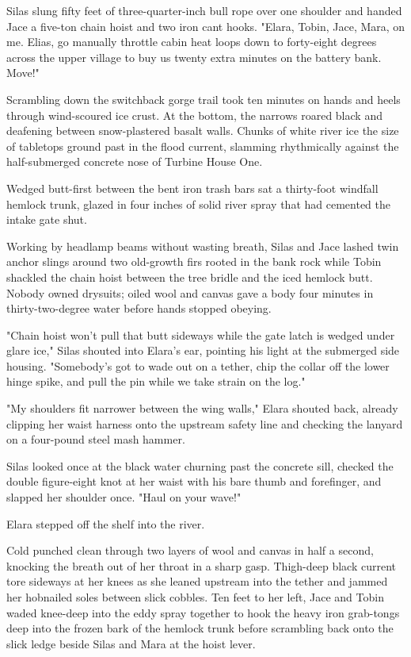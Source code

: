 Silas slung fifty feet of three-quarter-inch bull rope over one shoulder and handed Jace a five-ton chain hoist and two iron cant hooks. "Elara, Tobin, Jace, Mara, on me. Elias, go manually throttle cabin heat loops down to forty-eight degrees across the upper village to buy us twenty extra minutes on the battery bank. Move!"

Scrambling down the switchback gorge trail took ten minutes on hands and heels through wind-scoured ice crust. At the bottom, the narrows roared black and deafening between snow-plastered basalt walls. Chunks of white river ice the size of tabletops ground past in the flood current, slamming rhythmically against the half-submerged concrete nose of Turbine House One.

Wedged butt-first between the bent iron trash bars sat a thirty-foot windfall hemlock trunk, glazed in four inches of solid river spray that had cemented the intake gate shut.

Working by headlamp beams without wasting breath, Silas and Jace lashed twin anchor slings around two old-growth firs rooted in the bank rock while Tobin shackled the chain hoist between the tree bridle and the iced hemlock butt. Nobody owned drysuits; oiled wool and canvas gave a body four minutes in thirty-two-degree water before hands stopped obeying.

"Chain hoist won't pull that butt sideways while the gate latch is wedged under glare ice," Silas shouted into Elara's ear, pointing his light at the submerged side housing. "Somebody's got to wade out on a tether, chip the collar off the lower hinge spike, and pull the pin while we take strain on the log."

"My shoulders fit narrower between the wing walls," Elara shouted back, already clipping her waist harness onto the upstream safety line and checking the lanyard on a four-pound steel mash hammer.

Silas looked once at the black water churning past the concrete sill, checked the double figure-eight knot at her waist with his bare thumb and forefinger, and slapped her shoulder once. "Haul on your wave!"

Elara stepped off the shelf into the river.

Cold punched clean through two layers of wool and canvas in half a second, knocking the breath out of her throat in a sharp gasp. Thigh-deep black current tore sideways at her knees as she leaned upstream into the tether and jammed her hobnailed soles between slick cobbles. Ten feet to her left, Jace and Tobin waded knee-deep into the eddy spray together to hook the heavy iron grab-tongs deep into the frozen bark of the hemlock trunk before scrambling back onto the slick ledge beside Silas and Mara at the hoist lever.

